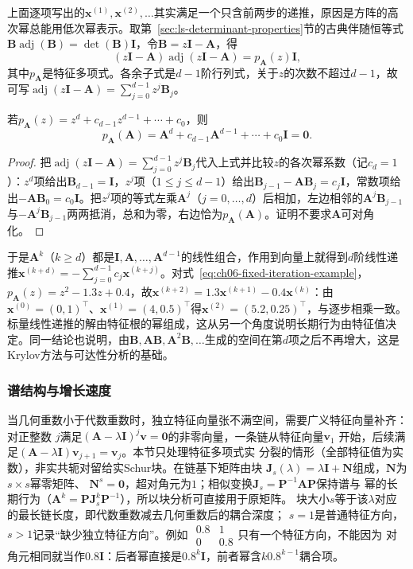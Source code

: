上面逐项写出的$\bm x^{(1)},\bm x^{(2)},\ldots$其实满足一个只含前两步的递推，原因是方阵的高次幂总能用低次幂表示。取第~\ref{sec:ls-determinant-properties}节的古典伴随恒等式$\bm B\operatorname{adj}(\bm B)=\det(\bm B)\bm I$，令$\bm B=z\bm I-\bm A$，得
\[
 (z\bm I-\bm A)\operatorname{adj}(z\bm I-\bm A)=p_{\bm A}(z)\bm I,
\]
其中$p_{\bm A}$是特征多项式。各余子式是$d-1$阶行列式，关于$z$的次数不超过$d-1$，故可写$\operatorname{adj}(z\bm I-\bm A)=\sum_{j=0}^{d-1}z^j\bm B_j$。
\begin{theorem}
\label{thm:ls-cayley-hamilton}
若$p_{\bm A}(z)=z^d+c_{d-1}z^{d-1}+\cdots+c_0$，则
\[
 p_{\bm A}(\bm A)
 =\bm A^d+c_{d-1}\bm A^{d-1}+\cdots+c_0\bm I=\bm0.
\]
\end{theorem}
\begin{proof}
把$\operatorname{adj}(z\bm I-\bm A)=\sum_{j=0}^{d-1}z^j\bm B_j$代入上式并比较$z$的各次幂系数（记$c_d=1$）：$z^d$项给出$\bm B_{d-1}=\bm I$，$z^j$项（$1\leq j\leq d-1$）给出$\bm B_{j-1}-\bm A\bm B_j=c_j\bm I$，常数项给出$-\bm A\bm B_0=c_0\bm I$。把$z^j$项的等式左乘$\bm A^j$（$j=0,\ldots,d$）后相加，左边相邻的$\bm A^j\bm B_{j-1}$与$-\bm A^{j}\bm B_{j-1}$两两抵消，总和为零，右边恰为$p_{\bm A}(\bm A)$。证明不要求$\bm A$可对角化。
\end{proof}
于是$\bm A^k$（$k\geq d$）都是$\bm I,\bm A,\ldots,\bm A^{d-1}$的线性组合，作用到向量上就得到$d$阶线性递推$\bm x^{(k+d)}=-\sum_{j=0}^{d-1}c_j\bm x^{(k+j)}$。对式~\eqref{eq:ch06-fixed-iteration-example}，$p_{\bm A}(z)=z^2-1.3z+0.4$，故$\bm x^{(k+2)}=1.3\bm x^{(k+1)}-0.4\bm x^{(k)}$：由$\bm x^{(0)}=(0,1)^\top$、$\bm x^{(1)}=(4,0.5)^\top$得$\bm x^{(2)}=(5.2,0.25)^\top$，与逐步相乘一致。标量线性递推的解由特征根的幂组成，这从另一个角度说明长期行为由特征值决定。同一结论也说明，由$\bm B,\bm A\bm B,\bm A^2\bm B,\ldots$生成的空间在第$d$项之后不再增大，这是Krylov方法与可达性分析的基础。

\subsubsection{谱结构与增长速度}

当几何重数小于代数重数时，独立特征向量张不满空间，需要广义特征向量补齐：对正整数
$j$满足$(\bm A-\lambda\bm I)^j\bm v=\bm0$的非零向量，一条链从特征向量$\bm v_1$
开始，后续满足$(\bm A-\lambda\bm I)\bm v_{j+1}=\bm v_j$。本节只处理特征多项式实
分裂的情形（全部特征值为实数），非实共轭对留给实Schur块。在链基下矩阵由块
$\bm J_s(\lambda)=\lambda\bm I+\bm N$组成，$\bm N$为$s\times s$幂零矩阵、
$\bm N^s=\bm0$，超对角元为$1$；相似变换$\bm J_s=\bm P^{-1}\bm A\bm P$保持谱与
幂的长期行为（$\bm A^k=\bm P\bm J_s^k\bm P^{-1}$），所以块分析可直接用于原矩阵。
块大小$s$等于该$\lambda$对应的最长链长度，即代数重数减去几何重数后的耦合深度；
$s=1$是普通特征方向，$s>1$记录“缺少独立特征方向”。例如
$\begin{smallmatrix}0.8&1\\0&0.8\end{smallmatrix}$只有一个特征方向，不能因为
对角元相同就当作$0.8\bm I$：后者幂直接是$0.8^k\bm I$，前者幂含$k0.8^{k-1}$耦合项。


